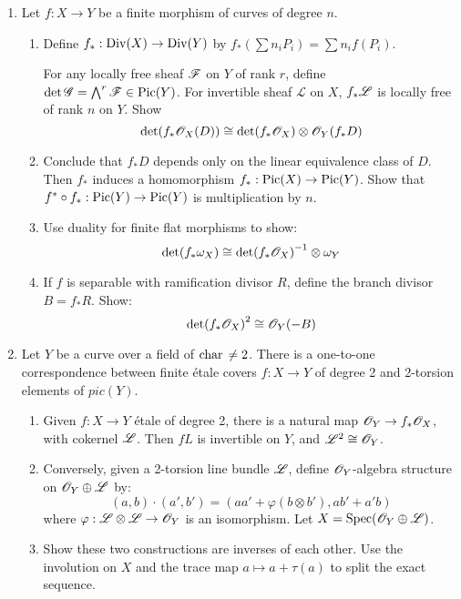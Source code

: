 \documentclass{article}
\begin{document}
\begin{enumerate} [label=\textbf{\arabic*.}, leftmargin=0em]
\begin{enumerate}[label=(\alph*)]
    \item Since $g \geq 2$, the LHS $> 0$. Show the RHS has minimum $1/42$, so $n \leq 84(g - 1)$.
    \textbf{Note:} This bound is sharp for infinitely many $g$ (Macbeath).
    In characteristic $p > 0$, same bound holds if $p > g + 1$, with one exception: $y^2 = x^p - x$, $p = 2g + 1$, which has $2p(p^2 - 1)$ automorphisms (Roquette).
\end{enumerate}

\item  Let $f: X \to Y$ be a finite morphism of curves of degree $n$.
\begin{enumerate}[label=(\alph*)]
    \item Define $f_*: \operatorname{Div}(X) \to \operatorname{Div}(Y)$ by $f_*(\sum n_i P_i) = \sum n_i f(P_i)$.

    For any locally free sheaf $\mathscr{F}$ on $Y$ of rank $r$, define $\det \mathscr{G} = \bigwedge^r \mathscr{F} \in \operatorname{Pic}(Y)$. For invertible sheaf $\mathcal{L}$ on $X$, $f_* \mathscr{L}$ is locally free of rank $n$ on $Y$.
    Show
    \[
    \det(f_*\mathscr{O}_X(D)) \cong \det(f_* \mathscr{O}_X) \otimes \mathscr{O}_Y(f_*D)
    \]

    \item Conclude that $f_*D$ depends only on the linear equivalence class of $D$.
    Then $f_*$ induces a homomorphism $f_*: \operatorname{Pic}(X) \to \operatorname{Pic}(Y)$.
    Show that $f^* \circ f_*: \operatorname{Pic}(Y) \to \operatorname{Pic}(Y)$ is multiplication by $n$.

    \item Use duality for finite flat morphisms to show:
    \[
    \det(f_* \omega_X) \cong \det(f_* \mathscr{O}_X)^{-1} \otimes \omega_Y
    \]

    \item If $f$ is separable with ramification divisor $R$, define the branch divisor $B = f_* R$. Show:
    \[
    \det(f_* \mathscr{O}_X)^2 \cong \mathscr{O}_Y(-B)
    \]
\end{enumerate}

\item  Let $Y$ be a curve over a field of $\operatorname{char}{} \neq 2$.
There is a one-to-one correspondence between finite étale covers $f: X \to Y$ of degree 2 and 2-torsion elements of $pic(Y)$.
\begin{enumerate}[label=(\alph*)]
    \item Given $f: X \to Y$ étale of degree 2, there is a natural map $\mathscr{O}_Y \to f_* \mathscr{O}_X$, with cokernel $\mathscr{L}$.
    Then $fL$ is invertible on $Y$, and $\mathscr{L}^2 \cong \mathscr{O}_Y$.

    \item Conversely, given a 2-torsion line bundle $\mathscr{L}$, define $\mathscr{O}_Y$-algebra structure on $\mathscr{O}_Y \oplus \mathscr{L}$ by:
    \[
    (a, b) \cdot (a', b') = (aa' + \varphi(b \otimes b'), ab' + a'b)
    \]
    where $\varphi: \mathscr{L} \otimes \mathscr{L} \to \mathscr{O}_Y$ is an isomorphism. Let $X = \operatorname{Spec}(\mathscr{O}_Y \oplus \mathscr{L})$.

    \item Show these two constructions are inverses of each other. Use the involution on $X$ and the trace map $a \mapsto a + \tau(a)$ to split the exact sequence.
\end{enumerate}

\end{enumerate}
\end{document}
